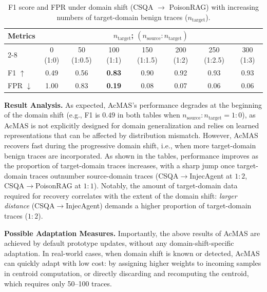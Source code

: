 \documentclass{article}
\theoremstyle{plain}
\theoremstyle{definition}
\theoremstyle{remark}
\begin{document}
\begin{table}[h]
\centering
\caption{F1 score and FPR under domain shift (CSQA $\rightarrow$ 
PoisonRAG) with increasing numbers of target-domain benign traces 
($n_{\text{target}}$).}
\label{tab:domain_shift_poisonrag}
\small
\setlength{\tabcolsep}{4pt}
\begin{tabular}{lccccccc}
\toprule
\multirow{2}{*}{Metrics} & \multicolumn{7}{c}{$n_{\text{target}}$; $(n_{\text{source}} : n_{\text{target}})$} \\
\cmidrule(lr){2-8}
 & 0 (1:0) & 50 (1:0.5) & 100 (1:1) & 150 (1:1.5) & 200 (1:2) & 250 (1:2.5) & 300 (1:3) \\
\midrule
F1 $\uparrow$  & 0.49 & 0.56 & \textbf{0.83} & 0.90 & 0.92 & 0.93 & 0.93 \\
FPR $\downarrow$ & 1.00 & 0.83 & \textbf{0.19} & 0.08 & 0.07 & 0.06 & 0.06 \\
\bottomrule
\end{tabular}
\end{table}

\noindent\textbf{Result Analysis.}
As expected, AcMAS's performance degrades at the beginning of the domain shift (e.g., F1 is $0.49$ in both tables when $n_{\text{source}} : n_{\text{target}} = 1{:}0$), as AcMAS is not explicitly designed for domain generalization and relies on learned representations that can be affected by distribution mismatch. However, AcMAS recovers fast during the progressive domain shift, i.e., when more target-domain benign traces are incorporated. As shown in the tables, performance improves as the proportion of target-domain traces increases, with a sharp jump once target-domain traces outnumber source-domain traces (CSQA$\rightarrow$InjecAgent at $1{:}2$, CSQA$\rightarrow$PoisonRAG at $1{:}1$). Notably, the amount of target-domain data required for recovery correlates with the extent of the domain shift: \emph{larger distance} (CSQA$\rightarrow$InjecAgent) demands a higher proportion of target-domain traces ($1{:}2$).

\noindent\textbf{Possible Adaptation Measures.}
Importantly, the above results of AcMAS are achieved by default prototype updates, without any domain-shift-specific adaptation. In real-world cases, when domain shift is known or detected, AcMAS can quickly adapt with low cost: by assigning higher weights to incoming samples in centroid computation, or directly discarding and recomputing the centroid, which requires only 50--100 traces.






    
    





    
    
    
        
        
\end{document}
